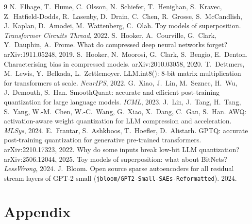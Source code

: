 \documentclass{article}
\begin{document}
\begin{thebibliography}{9}
 N.~Elhage, T.~Hume, C.~Olsson, N.~Schiefer, T.~Henighan, S.~Kravec, Z.~Hatfield-Dodds, R.~Lasenby, D.~Drain, C.~Chen, R.~Grosse, S.~McCandlish, J.~Kaplan, D.~Amodei, M.~Wattenberg, C.~Olah. Toy models of superposition. \emph{Transformer Circuits Thread}, 2022.
 S.~Hooker, A.~Courville, G.~Clark, Y.~Dauphin, A.~Frome. What do compressed deep neural networks forget? arXiv:1911.05248, 2019.
 S.~Hooker, N.~Moorosi, G.~Clark, S.~Bengio, E.~Denton. Characterising bias in compressed models. arXiv:2010.03058, 2020.
 T.~Dettmers, M.~Lewis, Y.~Belkada, L.~Zettlemoyer. LLM.int8(): 8-bit matrix multiplication for transformers at scale. \emph{NeurIPS}, 2022.
 G.~Xiao, J.~Lin, M.~Seznec, H.~Wu, J.~Demouth, S.~Han. SmoothQuant: accurate and efficient post-training quantization for large language models. \emph{ICML}, 2023.
 J.~Lin, J.~Tang, H.~Tang, S.~Yang, W.-M.~Chen, W.-C.~Wang, G.~Xiao, X.~Dang, C.~Gan, S.~Han. AWQ: activation-aware weight quantization for LLM compression and acceleration. \emph{MLSys}, 2024.
 E.~Frantar, S.~Ashkboos, T.~Hoefler, D.~Alistarh. GPTQ: accurate post-training quantization for generative pre-trained transformers. arXiv:2210.17323, 2022.
 Why do some inputs break low-bit LLM quantization? arXiv:2506.12044, 2025.
 Toy models of superposition: what about BitNets? \emph{LessWrong}, 2024.
 J.~Bloom. Open source sparse autoencoders for all residual stream layers of GPT-2 small (\texttt{jbloom/GPT2-Small-SAEs-Reformatted}). 2024.
\end{thebibliography}

\appendix
\section{Appendix}
\end{document}

